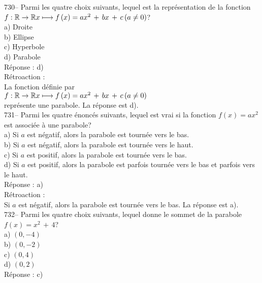 ﻿\documentclass[letterpaper, 12pt]{article}
\begin{document}
730-- Parmi les quatre choix suivants, lequel est la repr\'esentation de la
fonction \\
$f :\mathbb{R}\rightarrow\mathbb{R}\\
x\longmapsto f\left( x\right) =ax^{2}\,+\,bx\,+\,c \left( a\neq 0
\right)$?\\
a) Droite\\
b) Ellipse \\
c) Hyperbole\\
d) Parabole \\

R\'eponse : d)\\

R\'etroaction : \\
La fonction d\'efinie par\\
$f :\mathbb{R}\rightarrow\mathbb{R}\\
x\longmapsto f\left( x\right) =ax^{2}\,+\,bx\,+\,c \left( a\neq 0 \right)$
\\
repr\'esente une parabole.  La r\'eponse est d).\\

731-- Parmi les quatre \'enonc\'es suivants, lequel est vrai si la fonction
$f(x)=ax^{2}$ est associ\'ee \`a une parabole?\\
a) Si $a$ est n\'egatif, alors la parabole est tourn\'ee vers le bas.\\
b) Si $a$ est n\'egatif, alors la parabole est tourn\'ee vers le haut.  \\
c) Si $a$ est positif, alors la parabole est tourn\'ee vers le bas.\\
d) Si $a$ est positif, alors la parabole est parfois tourn\'ee vers le bas
et parfois vers le haut.\\

R\'eponse : a)\\

R\'etroaction : \\
Si $a$ est n\'egatif, alors la parabole est tourn\'ee vers le bas.  La
r\'eponse est a).\\

732-- Parmi les quatre choix suivants, lequel donne le sommet de la parabole
$f\left( x\right) =x^{2}\,+\,4$?\\
a) $(0,-4)$\\
b) $(0,-2)$\\
c) $(0,4)$\\
d) $(0,2)$\\

R\'eponse : c)\\
\end{document}
